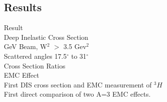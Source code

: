 \documentclass[12pt,usenames,dvipsnames]{beamer}
\begin{document}
\subsection[Results]{Results}
\begin{frame}
\Huge{Result}\\
\Large{Deep Inelastic Cross Section}\\
 GeV Beam, W$^2$ $>$ 3.5 Gev$^2$\\
\qquad Scattered angles 17.5$^\circ$ to 31$^\circ$\\
\Large{Cross Section Ratios}\\
\Large{EMC Effect}\\
\large{First DIS cross section and EMC measurement of $^3H$}\\
\large{First direct comparison of two A=3 EMC effects.}


\end{frame}
\end{document}
